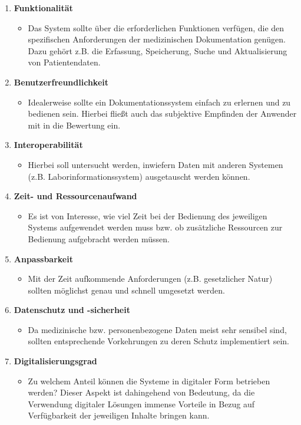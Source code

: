 \begin{enumerate}
	\item \textbf{Funktionalität}
	\begin{itemize}
		\item[] Das System sollte über die erforderlichen Funktionen verfügen, die den spezifischen Anforderungen der medizinischen Dokumentation genügen. Dazu gehört z.B. die Erfassung, Speicherung, Suche und Aktualisierung von Patientendaten.
	\end{itemize}
	\item \textbf{Benutzerfreundlichkeit}
	\begin{itemize}
		\item[] Idealerweise sollte ein Dokumentationssystem einfach zu erlernen und zu bedienen sein. Hierbei fließt auch das subjektive Empfinden der Anwender mit in die Bewertung ein.
	\end{itemize}
	\item \textbf{Interoperabilität}
	\begin{itemize}
		\item[] Hierbei soll untersucht werden, inwiefern Daten mit anderen Systemen (z.B. Laborinformationssystem) ausgetauscht werden können.
	\end{itemize}
	\item \textbf{Zeit- und Ressourcenaufwand}
	\begin{itemize}
		\item[] Es ist von Interesse, wie viel Zeit bei der Bedienung des jeweiligen Systems aufgewendet werden muss bzw. ob zusätzliche Ressourcen zur Bedienung aufgebracht werden müssen.
	\end{itemize}
	\item \textbf{Anpassbarkeit}
	\begin{itemize}
		\item[] Mit der Zeit aufkommende Anforderungen (z.B. gesetzlicher Natur) sollten möglichst genau und schnell umgesetzt werden.
	\end{itemize}
	\item \textbf{Datenschutz und -sicherheit}
	\begin{itemize}
		\item[] Da medizinische bzw. personenbezogene Daten meist sehr sensibel sind, sollten entsprechende Vorkehrungen zu deren Schutz implementiert sein.
	\end{itemize}
	\item \textbf{Digitalisierungsgrad}
	\begin{itemize}
		\item[] Zu welchem Anteil können die Systeme in digitaler Form betrieben werden? Dieser Aspekt ist dahingehend von Bedeutung, da die Verwendung digitaler Lösungen immense Vorteile in Bezug auf Verfügbarkeit der jeweiligen Inhalte bringen kann.
	\end{itemize}
\end{enumerate}


